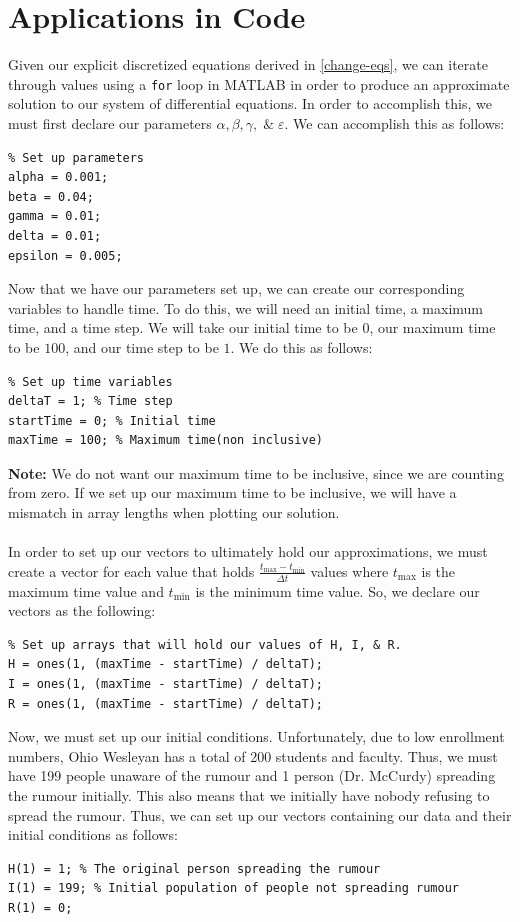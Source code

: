 \documentclass[11pt]{article}
\begin{document}
\section{Applications in Code} \label{applications-in-code}
Given our explicit discretized equations derived in \ref{change-eqs}, we can iterate through values using a \texttt{for} loop in MATLAB in order to produce an approximate solution to our system of differential equations.
In order to accomplish this, we must first declare our parameters $\alpha, \beta, \gamma, \; \& \; \varepsilon$.
We can accomplish this as follows:
\begin{lstlisting}
% Set up parameters
alpha = 0.001;
beta = 0.04;
gamma = 0.01;
delta = 0.01;
epsilon = 0.005;
\end{lstlisting}
Now that we have our parameters set up, we can create our corresponding variables to handle time.  
To do this, we will need an initial time, a maximum time, and a time step. 
We will take our initial time to be $0$, our maximum time to be $100$, and our time step to be $1$.  
We do this as follows:
\begin{lstlisting}
% Set up time variables
deltaT = 1; % Time step
startTime = 0; % Initial time
maxTime = 100; % Maximum time(non inclusive)
\end{lstlisting}
\textbf{Note:} We do not want our maximum time to be inclusive, since we are counting from zero.
If we set up our maximum time to be inclusive, we will have a mismatch in array lengths when plotting our solution. \\ \\
In order to set up our vectors to ultimately hold our approximations, we must create a vector for each value that holds $\frac{t_{\text{max}} - t_{\text{min}}}{\Delta t}$ values where $t_{\text{max}}$ is the maximum time value and $t_{\text{min}}$ is the minimum time value.
So, we declare our vectors as the following:
\begin{lstlisting}
% Set up arrays that will hold our values of H, I, & R.
H = ones(1, (maxTime - startTime) / deltaT);
I = ones(1, (maxTime - startTime) / deltaT);
R = ones(1, (maxTime - startTime) / deltaT);
\end{lstlisting}

Now, we must set up our initial conditions.  
Unfortunately, due to low enrollment numbers, Ohio Wesleyan has a total of 200 students and faculty.  Thus, we must have 199 people unaware of the rumour and 1 person (Dr. McCurdy) spreading the rumour initially.
This also means that we initially have nobody refusing to spread the rumour.  
Thus, we can set up our vectors containing our data and their initial conditions as follows:
\begin{lstlisting}
H(1) = 1; % The original person spreading the rumour
I(1) = 199; % Initial population of people not spreading rumour
R(1) = 0;
\end{lstlisting}
\end{document}
